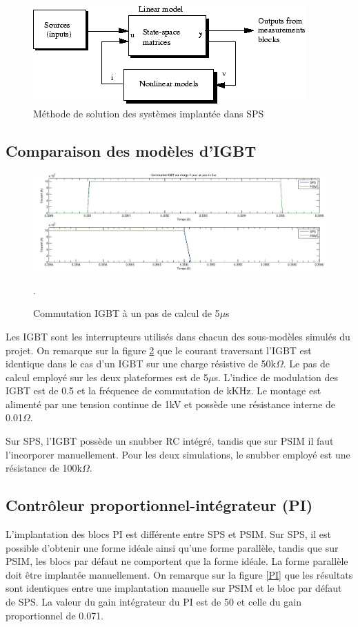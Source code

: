 \documentclass[11pt,letterpaper,final]{report}
\begin{document}
\begin{figure}
\centering
\includegraphics[scale=0.7]{Fig/Comp/improving_performance5.png}
\caption{Méthode de solution des systèmes implantée dans SPS}
\label{fig_solving_SPS}
\end{figure}

\subsection{Comparaison des modèles d'IGBT}

\begin{figure}[htb]
\centering
\includegraphics[scale=0.5]{Fig/Comp/IGBT.jpg}
\caption{Commutation IGBT à un pas de calcul de 5$\mu$s}.
\label{IG}
\end{figure}

Les IGBT sont les interrupteurs utilisés dans chacun des sous-modèles simulés du projet. On remarque sur la figure \ref{IG} que le  courant traversant l'IGBT est identique dans le cas d'un IGBT sur une charge résistive de 50k$\Omega$. Le pas de calcul employé sur les deux plateformes est de 5$\mu$s. L'indice de modulation des IGBT est de 0.5 et la fréquence de commutation de kKHz. Le montage est alimenté par une tension continue de 1kV et possède une résistance interne de 0.01$\Omega$. 

Sur SPS, l'IGBT possède un snubber RC intégré, tandis que sur PSIM il faut l'incorporer manuellement. Pour les deux simulations, le snubber employé est une résistance de 100k$\Omega$.
 
\subsection{Contrôleur proportionnel-intégrateur (PI)}
L'implantation des blocs PI est différente entre SPS et PSIM. Sur SPS, il est possible d'obtenir une forme idéale ainsi qu'une forme parallèle, tandis que sur PSIM, les blocs par défaut ne comportent que la forme idéale. La forme parallèle doit être implantée manuellement. On remarque sur la figure \ref{PI} que les résultats sont identiques entre une implantation manuelle sur PSIM et le bloc par défaut de SPS. La valeur du gain intégrateur du PI est de 50 et celle du gain proportionnel de 0.071. 
\end{document}

